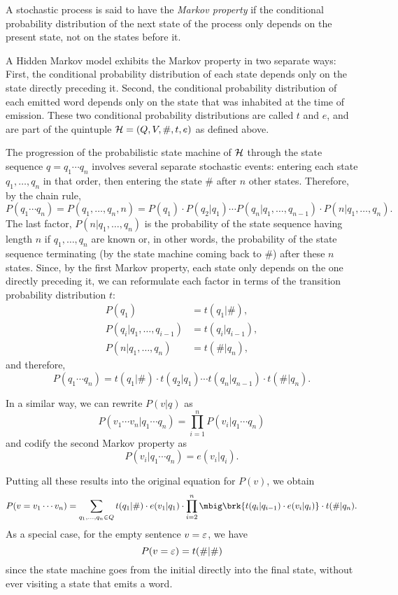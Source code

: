 \begin{definition}
 A stochastic process is said to have the \emph{Markov property} if the
 conditional probability distribution of the next state of the process only
 depends on the present state, not on the states before it.
\end{definition}

A Hidden Markov model exhibits the Markov property in two separate ways: First,
the conditional probability distribution of each state depends only on the
state directly preceding it. Second, the conditional probability distribution
of each emitted word depends only on the state that was inhabited at the time
of emission. These two conditional probability distributions are called $t$ and
$e$, and are part of the quintuple $\mathcal H=(Q,V,\#,t,e)$ as defined above.

The progression of the probabilistic state machine of $\mathcal H$ through the state
sequence $q=q_1\cdots q_n$ involves several separate stochastic events:
entering each state $q_1,\ldots,q_n$ in that order, then entering the state
$\#$ after $n$ other states. Therefore, by the chain rule,
\[
 P(q_1\cdots q_n) = P(q_1,\ldots,q_n,n) = P(q_1) \cdot P(q_2|q_1) \cdots P(q_n|q_1,\ldots,q_{n-1}) \cdot P(n|q_1,\ldots,q_n).
\]
The last factor, $P(n|q_1,\ldots,q_n)$ is the probability of the state sequence
having length $n$ if $q_1,\ldots,q_n$ are known or, in other words, the
probability of the state sequence terminating (by the state machine coming back
to $\#$) after these $n$ states. Since, by the first Markov property, each
state only depends on the one directly preceding it, we can reformulate each
factor in terms of the transition probability distribution $t$:
\begin{align*}
 P(q_1) &= t(q_1|\#), \\
 P(q_i|q_1,\ldots,q_{i-1}) &= t(q_i|q_{i-1}), \\
 P(n|q_1,\ldots,q_n) &= t(\#|q_n),
\end{align*}
and therefore,
\[
 P(q_1\cdots q_n) = t(q_1|\#) \cdot t(q_2|q_1) \cdots t(q_n|q_{n-1}) \cdot t(\#|q_n).
\]

In a similar way, we can rewrite $P(v|q)$ as
\[
 P(v_1\cdots v_n|q_1\cdots q_n) = \prod_{i=1}^n P(v_i|q_1\cdots q_n)
\]
and codify the second Markov property as
\[
 P(v_i|q_1\cdots q_n) = e(v_i|q_i).
\]

Putting all these results into the original equation for $P(v)$, we obtain
\begin{equation}\label{eq:03-p-v}
 P(v=v_1\cdots v_n) = \sum_{q_1,\ldots,q_n\in Q} t(q_1|\#) \cdot e(v_1|q_1) \cdot \prod_{i=2}^n \mbig\brk{t(q_i|q_{i-1}) \cdot e(v_i|q_i)} \cdot t(\#|q_n).
\end{equation}
As a special case, for the empty sentence $v=\varepsilon$, we have
\begin{equation}\label{eq:03-p-v-eps}
 P(v=\varepsilon) = t(\#|\#)
\end{equation}
since the state machine goes from the initial directly into the final state,
without ever visiting a state that emits a word.


